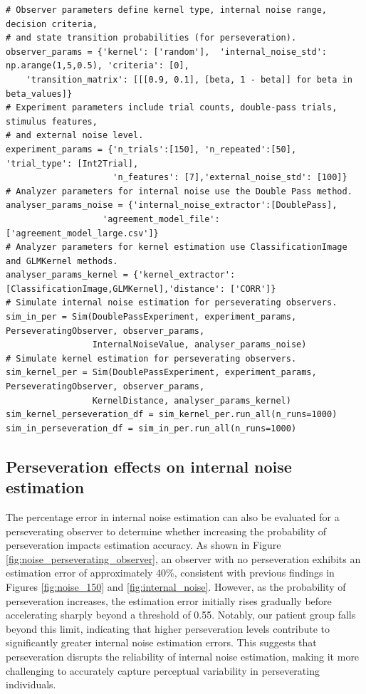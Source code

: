 \begin{tcolorbox}[title=Palin Toolbox: Perseverating observer,
    colback=white!30!white, colframe=blue!80!white]

\begin{verbatim}
# Observer parameters define kernel type, internal noise range, decision criteria, 
# and state transition probabilities (for perseveration).
observer_params = {'kernel': ['random'],  'internal_noise_std': np.arange(1,5,0.5), 'criteria': [0], 
    'transition_matrix': [[[0.9, 0.1], [beta, 1 - beta]] for beta in beta_values]}
# Experiment parameters include trial counts, double-pass trials, stimulus features, 
# and external noise level.
experiment_params = {'n_trials':[150], 'n_repeated':[50], 'trial_type': [Int2Trial],
                     'n_features': [7],'external_noise_std': [100]}
# Analyzer parameters for internal noise use the Double Pass method.
analyser_params_noise = {'internal_noise_extractor':[DoublePass],
                   'agreement_model_file':['agreement_model_large.csv']}   
# Analyzer parameters for kernel estimation use ClassificationImage and GLMKernel methods.
analyser_params_kernel = {'kernel_extractor': [ClassificationImage,GLMKernel],'distance': ['CORR']}
# Simulate internal noise estimation for perseverating observers.
sim_in_per = Sim(DoublePassExperiment, experiment_params,  PerseveratingObserver, observer_params, 
                 InternalNoiseValue, analyser_params_noise)
# Simulate kernel estimation for perseverating observers.
sim_kernel_per = Sim(DoublePassExperiment, experiment_params,  PerseveratingObserver, observer_params, 
                 KernelDistance, analyser_params_kernel)
sim_kernel_perseveration_df = sim_kernel_per.run_all(n_runs=1000) 
sim_in_perseveration_df = sim_in_per.run_all(n_runs=1000)
\end{verbatim}

\end{tcolorbox}
\subsection{Perseveration effects on internal noise estimation}
The percentage error in internal noise estimation can also be evaluated for a perseverating observer to determine whether increasing the probability of perseveration impacts estimation accuracy. As shown in Figure \ref{fig:noise_perseverating_observer}, an observer with no perseveration exhibits an estimation error of approximately 40\%, consistent with previous findings in Figures \ref{fig:noise_150} and \ref{fig:internal_noise}. However, as the probability of perseveration increases, the estimation error initially rises gradually before accelerating sharply beyond a threshold of 0.55. Notably, our patient group falls beyond this limit, indicating that higher perseveration levels contribute to significantly greater internal noise estimation errors. This suggests that perseveration disrupts the reliability of internal noise estimation, making it more challenging to accurately capture perceptual variability in perseverating individuals.


